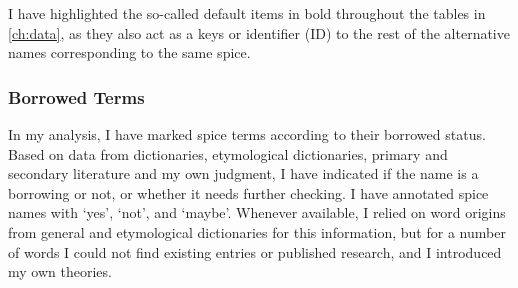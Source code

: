 
I have highlighted the so-called default items in bold throughout the tables in \cref{ch:data}, as they also act as a keys or identifier (ID) to the rest of the alternative names corresponding to the same spice.

\subsubsection{Borrowed Terms}
\label{sec:borrowed}

In my analysis, I have marked spice terms according to their borrowed status. Based on data from dictionaries, etymological dictionaries, primary and secondary literature and my own judgment, I have indicated if the name is a borrowing or not, or whether it needs further checking. I have annotated spice names with `yes', `not', and `maybe'. Whenever available, I relied on word origins from general and etymological dictionaries for this information, but for a number of words I could not find existing entries or published research, and I introduced my own theories. 




